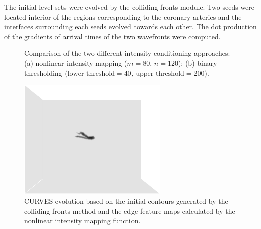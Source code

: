 The initial level sets were evolved by the colliding fronts module.
Two seeds were located interior of the regions corresponding to the coronary arteries and the interfaces surrounding each seeds evolved towards each other.
The dot production of the gradients of arrival times of the two wavefronts were computed.
\begin{figure}[t]
\centering
{}
\hfil
{}
\caption{Comparison of the two different intensity conditioning approaches: (a) nonlinear intensity mapping ($m = 80$, $n = 120$); (b) binary thresholding ($\text{lower threshold} = 40$, $\text{upper threshold} = 200$).}%
\label{fig:IntensityConditioning}
\end{figure}
\begin{figure}[t]
\centering
\includegraphics[width=2.8in]{figures/chap04/curves.eps}
\caption{CURVES evolution based on the initial contours generated by the colliding fronts method and the edge feature maps calculated by the nonlinear intensity mapping function.}%
\label{fig:CURVES}
\end{figure}
